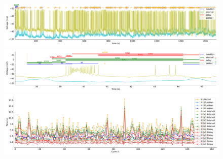 \begin{figure}[htbp]
	\centering
	\begin{minipage}[b]{\textwidth}
		\centering
		\includegraphics[width=\textwidth,height=0.1\textheight]{./invariants/data/SUSSEX/prep1/images/spontaneous_signal_intervals_zoom.pdf}
		\includegraphics[width=\textwidth]{./invariants/data/SUSSEX/prep1/images/spontaneous_signal_intervals_cycle.pdf}
		\includegraphics[width=\textwidth]{./invariants/data/SUSSEX/prep1/images/spontaneous_time_cycle.pdf}
	\end{minipage}
	\centering
	\begin{minipage}{0.9\textwidth}
		\begin{minipage}[b]{0.45\textwidth}
			\centering

\end{minipage}
\end{minipage}
\end{figure}

